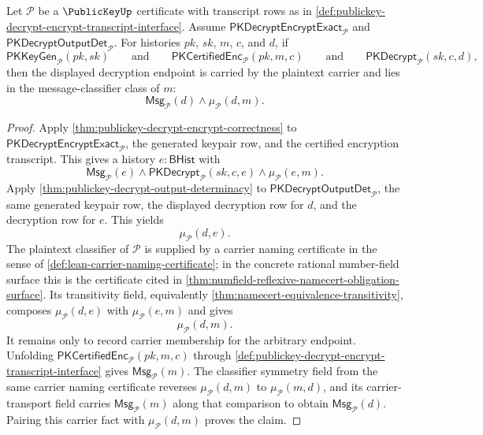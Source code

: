 \begin{theorem}
\label{thm:publickey-certified-encryption-arbitrary-decryption}
Let $\mathcal P$ be a $\PublicKeyUp$ certificate with transcript rows as in \autoref{def:publickey-decrypt-encrypt-transcript-interface}. Assume $\mathsf{PKDecryptEncryptExact}_{\mathcal P}$ and $\mathsf{PKDecryptOutputDet}_{\mathcal P}$. For histories $pk$, $sk$, $m$, $c$, and $d$, if
$$
\mathsf{PKKeyGen}_{\mathcal P}(pk,sk)
\qquad\text{and}\qquad
\mathsf{PKCertifiedEnc}_{\mathcal P}(pk,m,c)
\qquad\text{and}\qquad
\mathsf{PKDecrypt}_{\mathcal P}(sk,c,d),
$$
then the displayed decryption endpoint is carried by the plaintext carrier and lies in the message-classifier class of $m$:
$$
\mathsf{Msg}_{\mathcal P}(d)\land\mu_{\mathcal P}(d,m).
$$
\end{theorem}
\begin{proof}
Apply \autoref{thm:publickey-decrypt-encrypt-correctness} to $\mathsf{PKDecryptEncryptExact}_{\mathcal P}$, the generated keypair row, and the certified encryption transcript. This gives a history $e:\mathsf{BHist}$ with
$$
\mathsf{Msg}_{\mathcal P}(e)\land
\mathsf{PKDecrypt}_{\mathcal P}(sk,c,e)\land
\mu_{\mathcal P}(e,m).
$$
Apply \autoref{thm:publickey-decrypt-output-determinacy} to $\mathsf{PKDecryptOutputDet}_{\mathcal P}$, the same generated keypair row, the displayed decryption row for $d$, and the decryption row for $e$. This yields
$$
\mu_{\mathcal P}(d,e).
$$
The plaintext classifier of $\mathcal P$ is supplied by a carrier naming certificate in the sense of \autoref{def:lean-carrier-naming-certificate}; in the concrete rational number-field surface this is the certificate cited in \autoref{thm:numfield-reflexive-namecert-obligation-surface}. Its transitivity field, equivalently \autoref{thm:namecert-equivalence-transitivity}, composes $\mu_{\mathcal P}(d,e)$ with $\mu_{\mathcal P}(e,m)$ and gives
$$
\mu_{\mathcal P}(d,m).
$$
It remains only to record carrier membership for the arbitrary endpoint. Unfolding $\mathsf{PKCertifiedEnc}_{\mathcal P}(pk,m,c)$ through \autoref{def:publickey-decrypt-encrypt-transcript-interface} gives $\mathsf{Msg}_{\mathcal P}(m)$. The classifier symmetry field from the same carrier naming certificate reverses $\mu_{\mathcal P}(d,m)$ to $\mu_{\mathcal P}(m,d)$, and its carrier-transport field carries $\mathsf{Msg}_{\mathcal P}(m)$ along that comparison to obtain $\mathsf{Msg}_{\mathcal P}(d)$. Pairing this carrier fact with $\mu_{\mathcal P}(d,m)$ proves the claim.
\end{proof}

